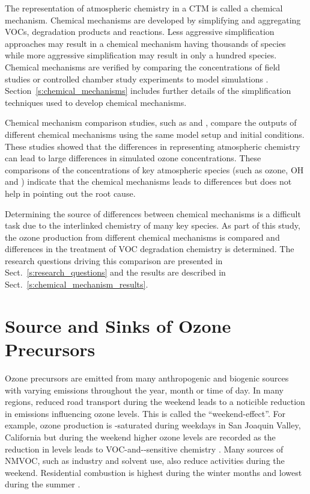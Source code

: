The representation of atmospheric chemistry in a CTM is called a chemical mechanism.
Chemical mechanisms are developed by simplifying and aggregating VOCs, degradation products and reactions.
Less aggressive simplification approaches may result in a chemical mechanism having thousands of species while more aggressive simplification may result in only a hundred species. 
Chemical mechanisms are verified by comparing the concentrations of field studies or controlled chamber study experiments to model simulations \citep{Stockwell:2012}.
Section~\ref{s:chemical_mechanisms} includes further details of the simplification techniques used to develop chemical mechanisms.

Chemical mechanism comparison studies, such as \citet{Kuhn:1998} and \citet{Emmerson:2009}, compare the outputs of different chemical mechanisms using the same model setup and initial conditions.
These studies showed that the differences in representing atmospheric chemistry can lead to large differences in simulated ozone concentrations.
These comparisons of the concentrations of key atmospheric species (such as ozone, OH and ) indicate that the chemical mechanisms leads to differences but does not help in pointing out the root cause.

Determining the source of differences between chemical mechanisms is a difficult task due to the interlinked chemistry of many key species.
As part of this study, the ozone production from different chemical mechanisms is compared and differences in the treatment of VOC degradation chemistry is determined.
The research questions driving this comparison are presented in Sect.~\ref{s:research_questions} and the results are described in Sect.~\ref{s:chemical_mechanism_results}.

\section{Source and Sinks of Ozone Precursors} \label{s:precursor_emissions}
Ozone precursors are emitted from many anthropogenic and biogenic sources with varying emissions throughout the year, month or time of day.
In many regions, reduced road transport during the weekend leads to a noticible reduction in  emissions influencing ozone levels.
This is called the ``weekend-effect''.
For example, ozone production is -saturated during weekdays in San Joaquin Valley, California but during the weekend higher ozone levels are recorded as the reduction in  levels leads to VOC-and--sensitive chemistry \citep{Pusede:2014}.
Many sources of NMVOC, such as industry and solvent use, also reduce activities during the weekend.
Residential combustion is highest during the winter months and lowest during the summer \citep{Gon:2011}.

